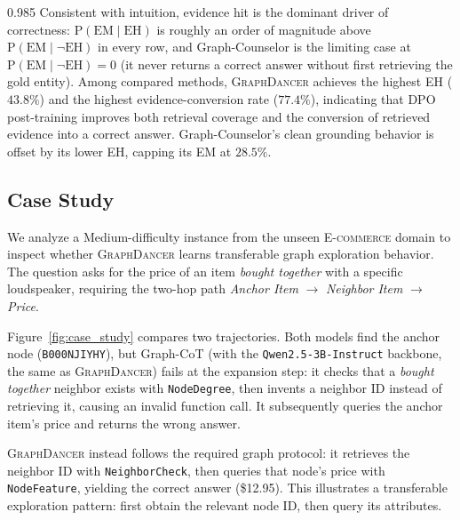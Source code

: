 \documentclass[11pt]{article}
\newcommand{\ours}{\textsc{GraphDancer}\xspace}
\begin{document}
\begin{spacing}{0.985}
Consistent with intuition, evidence hit is the dominant driver of correctness: $\mathrm{P}(\text{EM}\mid\text{EH})$ is roughly an order of magnitude above $\mathrm{P}(\text{EM}\mid\neg\text{EH})$ in every row, and Graph-Counselor is the limiting case at $\mathrm{P}(\text{EM}\mid\neg\text{EH}) = 0$ (it never returns a correct answer without first retrieving the gold entity). Among compared methods, \ours achieves the highest EH ($43.8\%$) and the highest evidence-conversion rate ($77.4\%$), indicating that DPO post-training improves both retrieval coverage and the conversion of retrieved evidence into a correct answer.
Graph-Counselor's clean grounding behavior is offset by its lower EH, capping its EM at $28.5\%$.

\subsection{Case Study}
\label{sec:case_study}

We analyze a Medium-difficulty instance from the unseen \textsc{E-commerce} domain to inspect whether \ours learns transferable graph exploration behavior. The question asks for the price of an item \textit{bought together} with a specific loudspeaker, requiring the two-hop path \textit{Anchor Item} $\rightarrow$ \textit{Neighbor Item} $\rightarrow$ \textit{Price}.

Figure~\ref{fig:case_study} compares two trajectories. Both models find the anchor node (\texttt{B000NJIYHY}), but Graph-CoT (with the \texttt{Qwen2.5-3B-Instruct} backbone, the same as \ours) fails at the expansion step: it checks that a \textit{bought together} neighbor exists with \texttt{NodeDegree}, then invents a neighbor ID instead of retrieving it, causing an invalid function call. It subsequently queries the anchor item's price and returns the wrong answer.

\ours instead follows the required graph protocol: it retrieves the neighbor ID with \texttt{NeighborCheck}, then queries that node's price with \texttt{NodeFeature}, yielding the correct answer (\$12.95). This illustrates a transferable exploration pattern: first obtain the relevant node ID, then query its attributes.


\end{spacing}
\end{document}
